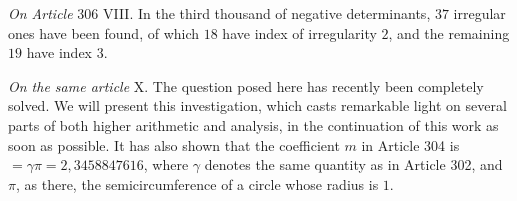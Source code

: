 \textit{On Article} 306 VIII. In the third thousand of negative determinants, \(37\) irregular ones have been found, of which \(18\) have index of irregularity \(2\), and the remaining \(19\) have index \(3\).

\clearpage\textit{On the same article} X. The question posed here has recently been completely solved. We will present this investigation, which casts remarkable light on several parts of both higher arithmetic and analysis, in the continuation of this work as soon as possible. It has also shown that the coefficient \(m\) in Article 304 is \(=\gamma\pi=2{,}3458847616\), where \(\gamma\) denotes the same quantity as in Article 302, and \(\pi\), as there, the semicircumference of a circle whose radius is \(1\).


